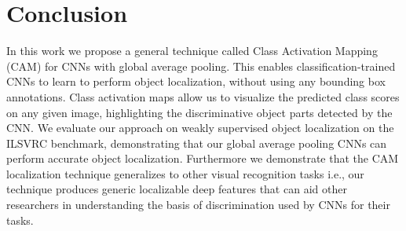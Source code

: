 \documentclass[10pt,twocolumn,letterpaper]{article}
\begin{document}
\section{Conclusion}


In this work we propose a general technique called Class Activation Mapping (CAM) for CNNs with global average pooling. This enables classification-trained CNNs to learn to perform object localization, without using any bounding box annotations. Class activation maps allow us to visualize the predicted class scores on any given image, highlighting the discriminative object parts detected by the CNN. We evaluate our approach on weakly supervised object localization on the ILSVRC benchmark, demonstrating that our global average pooling CNNs can perform accurate object localization. Furthermore we demonstrate that the CAM localization technique generalizes to other visual recognition tasks i.e., our technique produces generic localizable deep features that can aid other researchers in understanding the basis of discrimination used by CNNs for their tasks.

{\small


}
\end{document}
